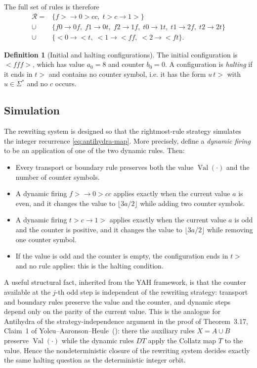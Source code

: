 \documentclass[11pt,a4paper]{article}
\theoremstyle{definition}
\newtheorem{definition}{Definition}[section]
\newcommand{\lt}{<}
\newcommand{\gt}{>}
\newcommand{\val}{\operatorname{Val}}
\begin{document}
The full set of rules is therefore
\begin{equation}
  \label{eq:all-rules}
  \begin{aligned}
  \mathcal{R}
  ={}&\{f\gt\to0\gt cc,\; t\gt c\to1\gt\}\\
  \cup{}&\{f0\to0f,\; f1\to0t,\; f2\to1f,\; t0\to1t,\; t1\to2f,\; t2\to2t\}\\
  \cup{}&\{\lt0\to\lt t,\; \lt1\to\lt ff,\; \lt2\to\lt ft\}.
  \end{aligned}
\end{equation}

\begin{definition}[Initial and halting configurations]
  The initial configuration is $\lt fff\gt$, which has value $a_0=8$
  and counter $b_0=0$.  A configuration is \emph{halting} if it ends in
  $t\gt$ and contains no counter symbol, i.e. it has the form
  $u\,t\gt$ with $u\in\Sigma^{*}$ and no $c$ occurs.
\end{definition}

\subsection{Simulation}
\label{subsec:simulation}

The rewriting system is designed so that the rightmost-rule strategy
simulates the integer recurrence \eqref{eq:antihydra-map}.  More
precisely, define a \emph{dynamic firing} to be an application of one
of the two dynamic rules.  Then:

\begin{itemize}
\item Every transport or boundary rule preserves both the value
  $\val(\cdot)$ and the number of counter symbols.
\item A dynamic firing $f\gt\to0\gt cc$ applies exactly when the
  current value $a$ is even, and it changes the value to
  $\lfloor3a/2\rfloor$ while adding two counter symbols.
\item A dynamic firing $t\gt c\to1\gt$ applies exactly when the
  current value $a$ is odd and the counter is positive, and it changes
  the value to $\lfloor3a/2\rfloor$ while removing one counter symbol.
\item If the value is odd and the counter is empty, the configuration
  ends in $t\gt$ and no rule applies: this is the halting condition.
\end{itemize}

A useful structural fact, inherited from the YAH framework, is that
the counter available at the $j$-th odd step is independent of the
rewriting strategy: transport and boundary rules preserve the value
and the counter, and dynamic steps depend only on the parity of the
current value.  This is the analogue for Antihydra of the
strategy-independence argument in the proof of Theorem~3.17, Claim~1
of Yolcu--Aaronson--Heule~(\cite[pp.~20--21]{YAH21}): there the
auxiliary rules $X=A\cup B$ preserve $\val(\cdot)$ while the dynamic
rules $DT$ apply the Collatz map $T$ to the value.  Hence the
nondeterministic closure of the rewriting system decides exactly the
same halting question as the deterministic integer orbit.
\end{document}
